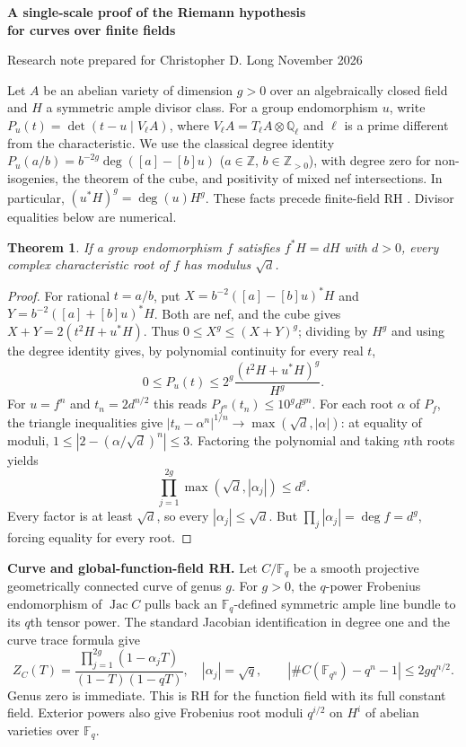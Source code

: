 \documentclass[11pt]{article}
\newtheorem{theorem}{Theorem}
\begin{document}
\begin{center}
{\Large\bfseries A single-scale proof of the Riemann hypothesis\\for curves over finite fields}\par\smallskip
{\small Research note prepared for Christopher D. Long  November 2026}
\end{center}\smallskip
\noindent
Let $A$ be an abelian variety of dimension $g>0$ over an algebraically closed
field and $H$ a symmetric ample divisor class. For a group endomorphism $u$,
write $P_u(t)=\det(t-u\mid V_\ell A)$, where $V_\ell A=T_\ell A\otimes\mathbb Q_\ell$ and $\ell$ is a prime different from the characteristic.
We use the classical degree identity $P_u(a/b)=b^{-2g}\deg([a]-[b]u)$
($a\in\mathbb Z$, $b\in\mathbb Z_{>0}$), with degree zero for non-isogenies,
the theorem of the cube, and positivity of mixed nef intersections. In
particular, $(u^*H)^g=\deg(u)H^g$. These facts precede finite-field RH
\cite{Mumford,Milne}. Divisor equalities below are numerical.

\begin{theorem}
If a group endomorphism $f$ satisfies $f^*H=dH$ with $d>0$, every complex characteristic root of $f$ has
modulus $\sqrt d$.
\end{theorem}
\begin{proof}
For rational $t=a/b$, put
$X=b^{-2}([a]-[b]u)^*H$ and $Y=b^{-2}([a]+[b]u)^*H$.
Both are nef, and the cube gives $X+Y=2(t^2H+u^*H)$. Thus
$0\le X^g\le(X+Y)^g$; dividing by $H^g$ and using the degree identity gives,
by polynomial continuity for every real $t$,
\[
0\le P_u(t)\le 2^g\frac{(t^2H+u^*H)^g}{H^g}.
\]
For $u=f^n$ and $t_n=2d^{n/2}$ this reads $P_{f^n}(t_n)\le10^g d^{gn}$.
For each root $\alpha$ of $P_f$, the triangle inequalities give
$|t_n-\alpha^n|^{1/n}\to\max(\sqrt d,|\alpha|)$: at equality of moduli,
$1\le |2-(\alpha/\sqrt d)^n|\le3$. Factoring the polynomial and taking
$n$th roots yields
\[
\prod_{j=1}^{2g}\max(\sqrt d,|\alpha_j|)\le d^g.
\]
Every factor is at least $\sqrt d$, so every $|\alpha_j|\le\sqrt d$.
But $\prod_j|\alpha_j|=\deg f=d^g$, forcing equality for every root.
\end{proof}

\noindent\textbf{Curve and global-function-field RH.}
Let $C/\mathbb F_q$ be a smooth projective geometrically connected curve of
genus $g$. For $g>0$, the $q$-power Frobenius endomorphism of $\operatorname{Jac} C$
pulls back an $\mathbb F_q$-defined symmetric ample line bundle to its $q$th
tensor power. The standard Jacobian identification in degree one and the
curve trace formula give
\[
Z_C(T)=\frac{\prod_{j=1}^{2g}(1-\alpha_j T)}{(1-T)(1-qT)},\quad
|\alpha_j|=\sqrt q,\qquad
|\#C(\mathbb F_{q^n})-q^n-1|\le 2gq^{n/2}.
\]
Genus zero is immediate. This is RH for the function field with its full
constant field. Exterior powers also give Frobenius root moduli $q^{i/2}$ on
$H^i$ of abelian varieties over $\mathbb F_q$.
\end{document}
